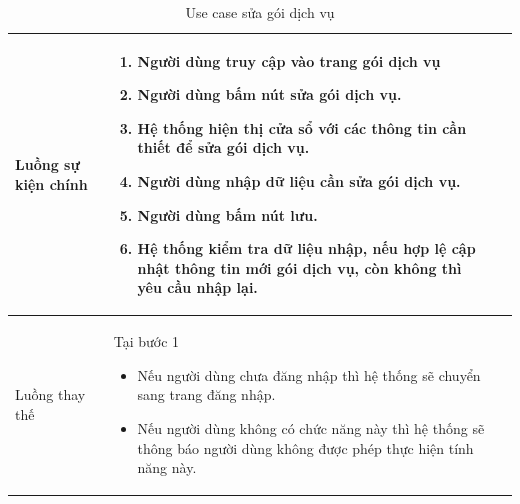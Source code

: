 \documentclass[12pt,a4paper]{article}
\begin{document}
\begin{table}[H]
\begin{tabular}{|p{3.5cm}|p{11.5cm}|c|}
            Luồng sự kiện chính & \vspace{-.8cm}\begin{enumerate}
                                                    \item Người dùng truy cập vào trang gói dịch vụ
                                                    \item  Người dùng bấm nút sửa gói dịch vụ.
                                                    \item  Hệ thống hiện thị cửa sổ với các thông tin cần thiết để sửa gói dịch vụ.
                                                    \item  Người dùng nhập dữ liệu cần sửa gói dịch vụ.
                                                    \item Người dùng bấm nút lưu.
                                                    \item Hệ thống kiểm tra dữ liệu nhập, nếu hợp lệ cập nhật thông tin mới gói dịch vụ, còn không thì yêu cầu nhập lại.
            \end{enumerate}
            \\
            \hline
            Luồng thay thế & Tại bước 1\newline
            \vspace{-.8cm}\begin{itemize}
                              \item Nếu người dùng chưa đăng nhập thì hệ thống sẽ chuyển sang trang đăng nhập.
                              \item  Nếu người dùng không có chức năng này thì hệ thống sẽ thông báo người dùng không được phép thực hiện tính năng này.
            \end{itemize}
            \\
            \hline
        \end{tabular}
        \caption{Use case sửa gói dịch vụ }
    \end{table}


\end{document}
